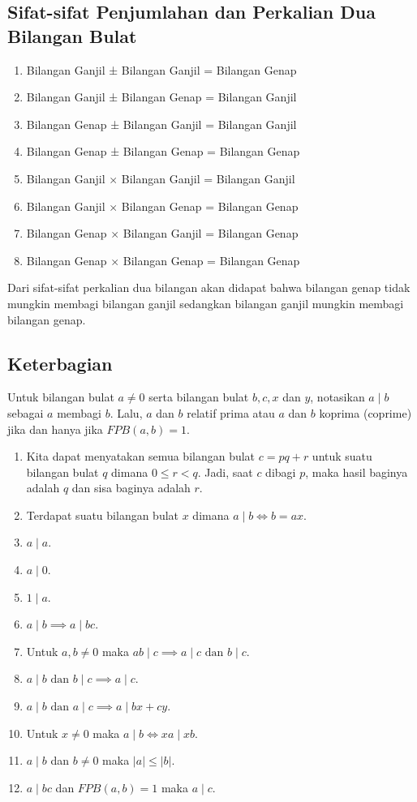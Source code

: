 	\subsection{Sifat-sifat Penjumlahan dan Perkalian Dua Bilangan Bulat}
    \begin{enumerate}
        \item Bilangan Ganjil ± Bilangan Ganjil = Bilangan Genap 
        \item Bilangan Ganjil ± Bilangan Genap = Bilangan Ganjil 
        \item Bilangan Genap ± Bilangan Ganjil = Bilangan Ganjil 
        \item Bilangan Genap ± Bilangan Genap = Bilangan Genap 
        \item Bilangan Ganjil $\times$ Bilangan Ganjil = Bilangan Ganjil 
        \item Bilangan Ganjil $\times$ Bilangan Genap = Bilangan Genap 
        \item Bilangan Genap $\times$ Bilangan Ganjil = Bilangan Genap 
        \item Bilangan Genap $\times$ Bilangan Genap = Bilangan Genap
    \end{enumerate}
    Dari sifat-sifat perkalian dua bilangan akan didapat bahwa bilangan genap tidak mungkin membagi 
    bilangan ganjil sedangkan bilangan ganjil mungkin membagi bilangan genap. 
    \subsection{Keterbagian}
    Untuk bilangan bulat $a \neq 0$ serta bilangan bulat $b,c,x$ dan $y$, notasikan $a \mid b$ sebagai $a$ membagi $b$. Lalu, $a$ dan $b$ relatif prima atau $a$ dan $b$ koprima (coprime) jika dan hanya jika $FPB(a,b)=1$.
    \begin{enumerate}
        \item Kita dapat menyatakan semua bilangan bulat $c = pq+r$ untuk suatu bilangan bulat $q$ dimana $0 \le r < q$. Jadi, saat $c$ dibagi $p$, maka hasil baginya adalah $q$ dan sisa baginya adalah $r$.
        \item Terdapat suatu bilangan bulat $x$ dimana $a \mid b \iff b=ax$.
        \item $a \mid a$.
        \item $a \mid 0$.
        \item $1 \mid a$.
        \item $a \mid b \implies a \mid bc$.
        \item Untuk $a,b \neq 0$ maka $ab \mid c \implies a \mid c \text{ dan } b \mid c$.
        \item $a \mid b \text{ dan } b \mid c \implies a \mid c$.
        \item $a \mid b \text{ dan } a \mid c \implies a \mid bx + cy$.
        \item Untuk $x \neq 0$ maka $a \mid b \iff xa \mid xb$.
        \item $a \mid b$ dan $b \neq 0$ maka $|a| \le |b|$.
        \item $a \mid bc$ dan $FPB(a,b)=1$ maka $a\mid c$.
    \end{enumerate}
